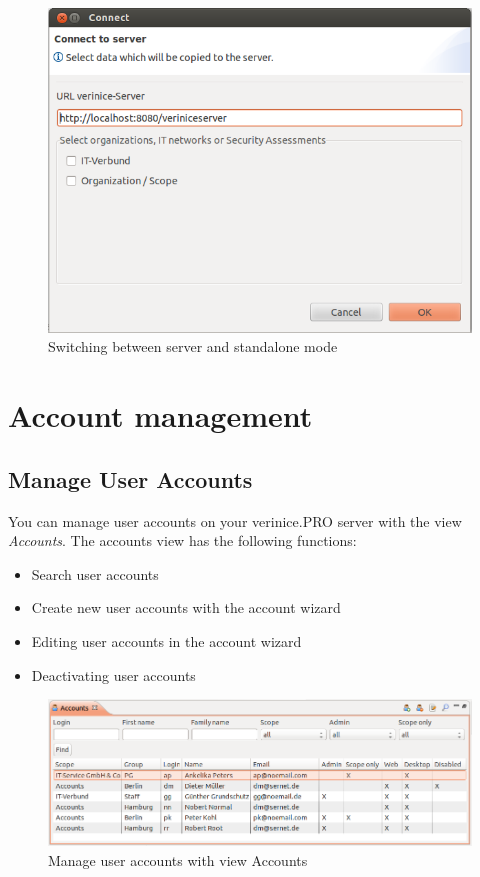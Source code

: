 \documentclass[a4paper,10pt]{book}
\begin{document}
\begin{figure}[htb!]
  \centering
  \includegraphics[scale=.6]{Screenshot/Modus_wechseln-en.png}
  \caption{\label{Switching between server and standalone mode} Switching between server and standalone mode}
\end{figure}

\section{Account management} \label{sec:account-management}
\subsection{Manage User Accounts}

You can manage user accounts on your verinice.PRO server with the view \textit{Accounts}. The accounts view has the following functions:
\begin{itemize}
\item Search user accounts
\item Create new user accounts with the account wizard
\item Editing user accounts in the account wizard
\item Deactivating user accounts
\end{itemize}

\begin{figure}[htb!]
  \centering
  \includegraphics[scale=.345]{Screenshot/Account-View.png}
  \caption{\label{Manage user accounts with view Accounts} Manage user accounts with view Accounts}
\end{figure}
\end{document}
